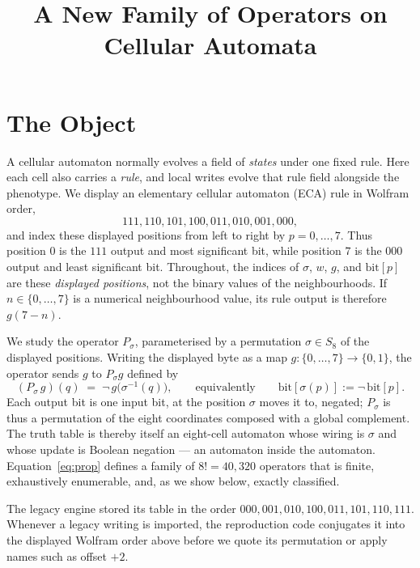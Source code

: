 \documentclass[man,12pt,floatsintext,donotrepeattitle]{apa7}
\title{A New Family of Operators on Cellular Automata}
\newcommand{\sig}{\sigma}
\newcommand{\bit}[1]{\mathrm{bit}[#1]}
\begin{document}
\maketitle

\section{The Object}
\label{sec:object}

A cellular automaton normally evolves a field of \emph{states} under one
fixed rule. Here each cell also carries a \emph{rule}, and local writes evolve
that rule field alongside the phenotype. We display an elementary cellular
automaton (ECA) rule in Wolfram order,
\[
111,110,101,100,011,010,001,000,
\]
and index these displayed positions from left to right by $p=0,\ldots,7$.
Thus position $0$ is the $111$ output and most significant bit, while position
$7$ is the $000$ output and least significant bit. Throughout, the indices of
$\sig$, $w$, $g$, and $\bit{p}$ are these \emph{displayed positions}, not the
binary values of the neighbourhoods. If $n\in\{0,\ldots,7\}$ is a numerical
neighbourhood value, its rule output is therefore $g(7-n)$.

We study the operator $P_\sig$, parameterised by a permutation
$\sig\in S_8$ of the displayed positions. Writing the displayed byte as a map
$g\colon\{0,\dots,7\}\to\{0,1\}$, the operator sends $g$ to $P_\sig g$ defined by
\begin{equation}
(P_\sig\, g)(q) \;=\; \lnot\, g\bigl(\sig^{-1}(q)\bigr),
\qquad\text{equivalently}\qquad \bit{\sig(p)} := \lnot\,\bit{p}.
\label{eq:prop}
\end{equation}
Each output bit is one input bit, at the position $\sig$ moves it to, negated;
$P_\sig$ is thus a permutation of the eight coordinates composed with a global
complement. The truth table is thereby itself an eight-cell automaton whose
wiring is $\sig$ and whose update is Boolean negation --- an automaton inside
the automaton. Equation~\eqref{eq:prop} defines a family of $8! = 40{,}320$
operators that is finite, exhaustively enumerable, and, as we show below,
exactly classified.

The legacy engine stored its table in the order
$000,001,010,100,011,101,110,111$. Whenever a legacy writing is imported, the
reproduction code conjugates it into the displayed Wolfram order above before
we quote its permutation or apply names such as offset $+2$.
\end{document}
